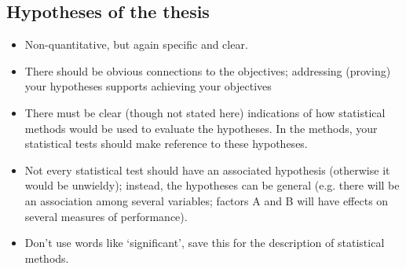 \subsection*{Hypotheses of the thesis}
\begin{itemize}
  \item Non-quantitative, but again specific and clear.
  \item There should be obvious connections to the objectives; addressing (proving) your hypotheses
  supports achieving your objectives
  \item There must be clear (though not stated here) indications of how statistical methods would be
  used to evaluate the hypotheses. In the methods, your statistical tests should make reference to 
  these hypotheses.
  \item Not every statistical test should have an associated hypothesis (otherwise it would be
  unwieldy); instead, the hypotheses can be general (e.g. there will be an association among several 
  variables; factors A and B will have effects on several measures of performance).
  \item Don’t use words like ‘significant’, save this for the description of statistical methods.
\end{itemize}

